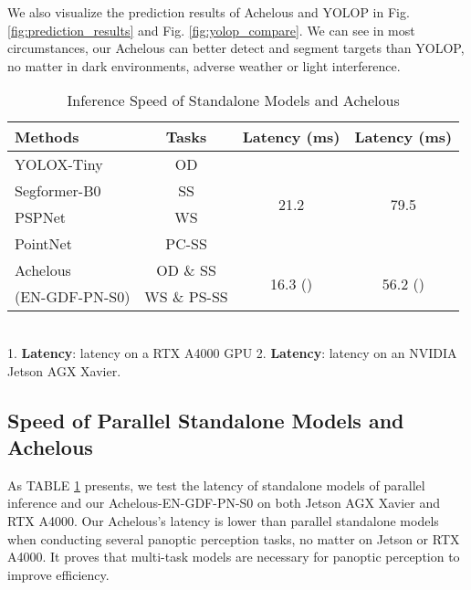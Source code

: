 \documentclass[letterpaper, 10 pt, conference]{ieeeconf}
\begin{document}
We also visualize the prediction results of Achelous and YOLOP in Fig. \ref{fig:prediction_results} and Fig. \ref{fig:yolop_compare}. We can see in most circumstances, our Achelous can better detect and segment targets than YOLOP, no matter in dark environments, adverse weather or light interference.

\begin{table}
\setlength\tabcolsep{2.3pt}
\caption{Inference Speed of Standalone Models and Achelous}
\centering
\label{tab:speed_compare}
\begin{tabular}{l|c|c|c}  
\toprule   
  \textbf{Methods} & \textbf{Tasks} & \textbf{Latency (ms)} & \textbf{Latency (ms)}  \\

\midrule
  YOLOX-Tiny \cite{ge2021yolox} & OD  & \multirow{4}[2]{*}{21.2}  & \multirow{4}[2]{*}{79.5}  \\
  Segformer-B0 \cite{xie2021segformer} & SS &  \\
  PSPNet \cite{zhao2017pyramid} & WS &   \\
  PointNet \cite{Charles_Su_Kaichun_Guibas_2017} & PC-SS &  \\
\midrule 
  Achelous & OD \& SS  & \multirow{2}[2]{*}{16.3 ()}  &  \multirow{2}[2]{*}{56.2  ()}   \\
     (EN-GDF-PN-S0)                                    &  WS \& PS-SS &      \\
  
\bottomrule  
\end{tabular}
\\
\vspace{1mm}
\footnotesize{1. \textbf{Latency}: latency on a RTX A4000 GPU 2. \textbf{Latency}: latency on an NVIDIA Jetson AGX Xavier.}\\
\end{table}

\subsection{Speed of Parallel Standalone Models and Achelous}
As TABLE \ref{tab:speed_compare} presents, we test the latency of standalone models of parallel inference and our Achelous-EN-GDF-PN-S0 on both Jetson AGX Xavier and RTX A4000. Our Achelous's latency is lower than parallel standalone models when conducting several panoptic perception tasks, no matter on Jetson or RTX A4000. It proves that multi-task models are necessary for panoptic perception to improve efficiency.
\end{document}
